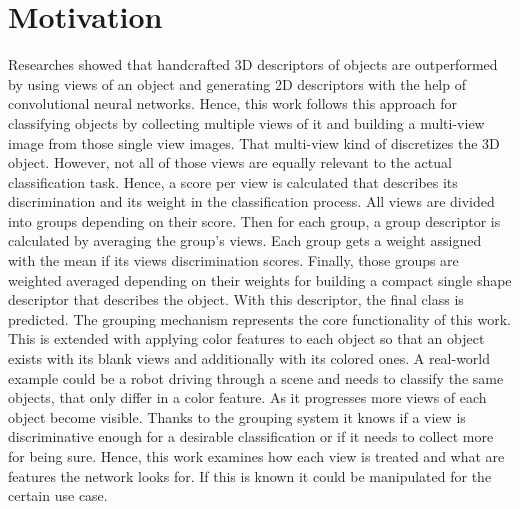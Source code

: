 \section{Motivation}
\label{sec:overview-motivation}
Researches showed that handcrafted 3D descriptors of objects are outperformed by using views of an object and generating 2D descriptors with the help of convolutional neural networks.
Hence, this work follows this approach for classifying objects by collecting multiple views of it and building a multi-view image from those single view images.
That multi-view kind of discretizes the 3D object. 
However, not all of those views are equally relevant to the actual classification task.
Hence, a score per view is calculated that describes its discrimination and its weight in the classification process.
All views are divided into groups depending on their score.
Then for each group, a group descriptor is calculated by averaging the group's views.
Each group gets a weight assigned with the mean if its views discrimination scores.
Finally, those groups are weighted averaged depending on their weights for building a compact single shape descriptor that describes the object.
With this descriptor, the final class is predicted.
The grouping mechanism represents the core functionality of this work.
This is extended with applying color features to each object so that an object exists with its blank views and additionally with its colored ones.
A real-world example could be a robot driving through a scene and needs to classify the same objects, that only differ in a color feature.
As it progresses more views of each object become visible.
Thanks to the grouping system it knows if a view is discriminative enough for a desirable classification or if it needs to collect more for being sure.
Hence, this work examines how each view is treated and what are features the network looks for.
If this is known it could be manipulated for the certain use case.